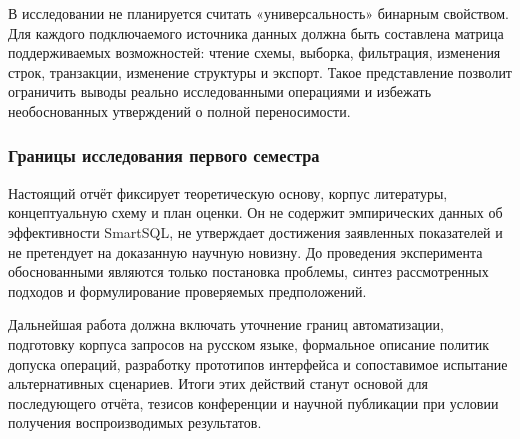 В исследовании не планируется считать «универсальность» бинарным свойством. Для каждого подключаемого источника данных должна быть составлена матрица поддерживаемых возможностей: чтение схемы, выборка, фильтрация, изменения строк, транзакции, изменение структуры и экспорт. Такое представление позволит ограничить выводы реально исследованными операциями и избежать необоснованных утверждений о полной переносимости.

\subsubsection{Границы исследования первого семестра}

Настоящий отчёт фиксирует теоретическую основу, корпус литературы, концептуальную схему и план оценки. Он не содержит эмпирических данных об эффективности SmartSQL, не утверждает достижения заявленных показателей и не претендует на доказанную научную новизну. До проведения эксперимента обоснованными являются только постановка проблемы, синтез рассмотренных подходов и формулирование проверяемых предположений.

Дальнейшая работа должна включать уточнение границ автоматизации, подготовку корпуса запросов на русском языке, формальное описание политик допуска операций, разработку прототипов интерфейса и сопоставимое испытание альтернативных сценариев. Итоги этих действий станут основой для последующего отчёта, тезисов конференции и научной публикации при условии получения воспроизводимых результатов.